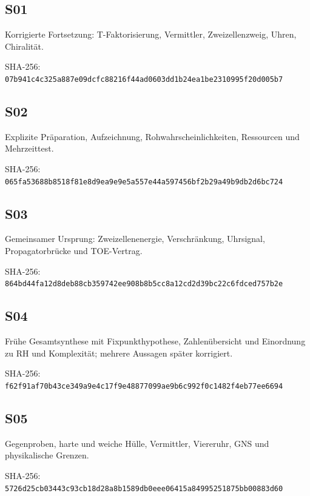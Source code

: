 \needspace{32mm}
\subsection*{S01}
\par
Korrigierte Fortsetzung: T-Faktorisierung, Vermittler, Zweizellenzweig, Uhren, Chiralität.
{\footnotesize SHA-256: \texttt{07b941c4c325a887e09dcfc88216f44a}\newline\texttt{d0603dd1b24ea1be2310995f20d005b7}\par}
\needspace{32mm}
\subsection*{S02}
\par
Explizite Präparation, Aufzeichnung, Rohwahrscheinlichkeiten, Ressourcen und Mehrzeittest.
{\footnotesize SHA-256: \texttt{065fa53688b8518f81e8d9ea9e9e5a55}\newline\texttt{7e44a597456bf2b29a49b9db2d6bc724}\par}
\needspace{32mm}
\subsection*{S03}
\par
Gemeinsamer Ursprung: Zweizellenenergie, Verschränkung, Uhrsignal, Propagatorbrücke und TOE-Vertrag.
{\footnotesize SHA-256: \texttt{864bd44fa12d8deb88cb359742ee908b}\newline\texttt{8b5cc8a12cd2d39bc22c6fdced757b2e}\par}
\needspace{32mm}
\subsection*{S04}
\par
Frühe Gesamtsynthese mit Fixpunkthypothese, Zahlenübersicht und Einordnung zu RH und Komplexität; mehrere Aussagen später korrigiert.
{\footnotesize SHA-256: \texttt{f62f91af70b43ce349a9e4c17f9e4887}\newline\texttt{7099ae9b6c992f0c1482f4eb77ee6694}\par}
\needspace{32mm}
\subsection*{S05}
\par
Gegenproben, harte und weiche Hülle, Vermittler, Viereruhr, GNS und physikalische Grenzen.
{\footnotesize SHA-256: \texttt{5726d25cb03443c93cb18d28a8b1589d}\newline\texttt{b0eee06415a84995251875bb00883d60}\par}
\needspace{32mm}
